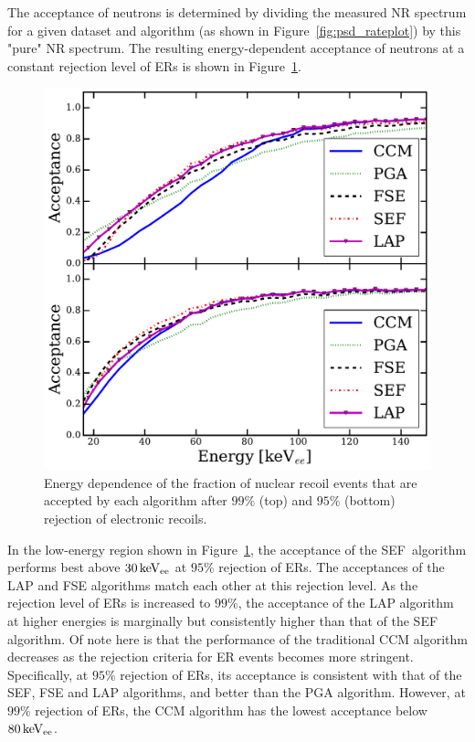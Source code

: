 The acceptance of neutrons is determined by dividing the measured NR spectrum for a given dataset and algorithm (as shown in Figure~\ref{fig:psd_rateplot}) by this "pure" NR spectrum. The resulting energy-dependent acceptance of neutrons at a constant rejection level of ERs is shown in Figure~\ref{fig:psd_acceptance}.

\begin{figure}[htbp]
\centering
    \includegraphics[width = \textwidth]{figures/psd/fig_acceptance}
    \caption{Energy dependence of the fraction of nuclear recoil events that are accepted by each algorithm after $99\%$ (top) and $95\%$ (bottom) rejection of electronic recoils.}\label{fig:psd_acceptance}
\end{figure}

In the low-energy region shown in Figure~\ref{fig:psd_acceptance}, the acceptance of the SEF~algorithm performs best above $30\,\mathrm{keV_{ee}}$ at $95\%$ rejection of ERs. The acceptances of the LAP and FSE algorithms match each other at this rejection level. As the rejection level of ERs is increased to $99\%$, the acceptance of the LAP algorithm at higher energies is marginally but consistently higher than that of the SEF algorithm. Of note here is that the performance of the traditional CCM algorithm decreases as the rejection criteria for ER events becomes more stringent. Specifically, at $95\%$ rejection of ERs, its acceptance is consistent with that of the SEF, FSE and LAP algorithms, and better than the PGA algorithm. However, at $99\%$ rejection of ERs, the CCM algorithm has the lowest acceptance below $80\,\mathrm{keV_{ee}}$.

